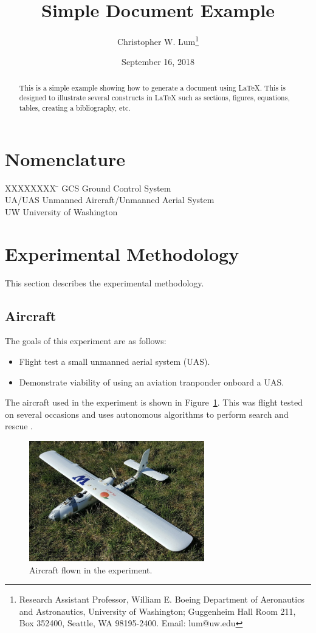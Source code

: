 \documentclass{article}
\title{Simple Document Example}
\author{Christopher W. Lum\thanks{Research Assistant Professor, William E. Boeing Department of Aeronautics and Astronautics, University of Washington; Guggenheim Hall Room 211, Box 352400, Seattle, WA 98195-2400.  Email: lum@uw.edu}}
\date{September 16, 2018}
\begin{document}
\maketitle

\begin{abstract}
This is a simple example showing how to generate a document using LaTeX.  This is designed to illustrate several constructs in LaTeX such as sections, figures, equations, tables, creating a bibliography, etc.
\end{abstract}

\section*{Nomenclature}
\label{sec:nomenclature}
\begin{tabbing}
    XXXXXXXX \= \kill%
	GCS					\> Ground Control System\\    
	UA/UAS              \> Unmanned Aircraft/Unmanned Aerial System\\
	UW					\> University of Washington	
\end{tabbing}

\section{Experimental Methodology}
This section describes the experimental methodology.

\subsection{Aircraft}
The goals of this experiment are as follows:

\begin{itemize}
    \item Flight test a small unmanned aerial system (UAS).
    \item Demonstrate viability of using an aviation tranponder onboard a UAS.
\end{itemize}

The aircraft used in the experiment is shown in Figure~\ref{fig:Aircraft}.  This was flight tested on several occasions \cite{Lum_ADSB_sUAS_2017} and uses autonomous algorithms to perform search and rescue \cite{Lum_Searching_JACIC_2010}.  

\begin{figure}[ht]
	\centering
    \includegraphics[width=3in]{Aircraft}
    \caption{Aircraft flown in the experiment.}
    \label{fig:Aircraft}
\end{figure}
\end{document}
